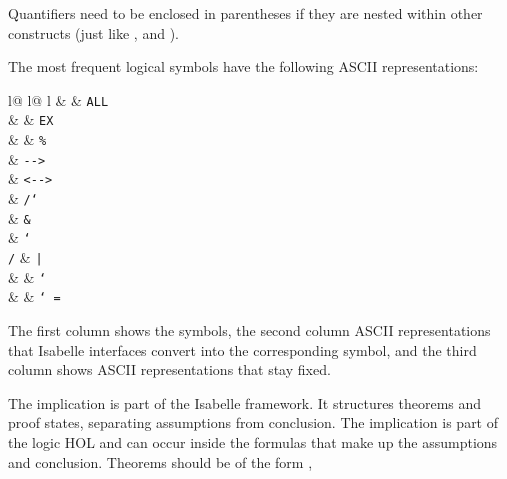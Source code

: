 \begin{isabellebody}
\begin{isamarkuptext}
\begin{warn}
\end{warn}
\begin{warn}
Quantifiers need to be enclosed in parentheses if they are nested within
other constructs (just like ,  and ).
\end{warn}
The most frequent logical symbols have the following ASCII representations:
\begin{center}
\begin{tabular}{l@ {\qquad}l@ {\qquad}l}
 &  & \texttt{ALL}\\
 &  & \texttt{EX}\\
 &  & \texttt{\%}\\
 & \texttt{-{}->}\\
 & \texttt{<-{}->}\\
 & \texttt{/\char`\\} & \texttt{\&}\\
 & \texttt{\char`\\/} & \texttt{|}\\
 &  & \texttt{\char`~}\\
 &  & \texttt{\char`~=}
\end{tabular}
\end{center}
The first column shows the symbols, the second column ASCII representations
that Isabelle interfaces convert into the corresponding symbol,
and the third column shows ASCII representations that stay fixed.
\begin{warn}
The implication  is part of the Isabelle framework. It structures
theorems and proof states, separating assumptions from conclusion.
The implication  is part of the logic HOL and can occur inside the
formulas that make up the assumptions and conclusion.
Theorems should be of the form ,

\end{warn}
\end{isamarkuptext}
\end{isabellebody}
